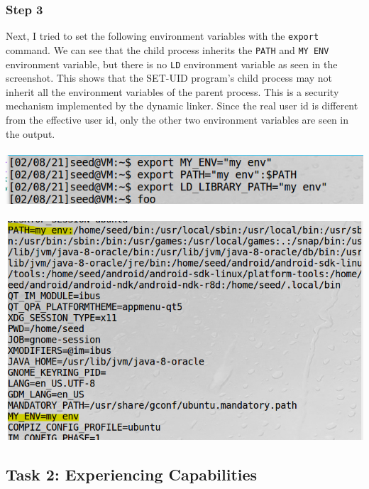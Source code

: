 \documentclass[a4paper]{article}
\begin{document}
\subsubsection{Step 3}
Next, I tried to set the following environment variables with the \verb+export+ command. We can see that the child process inherits the \verb+PATH+ and \verb+MY ENV+ environment variable, but there is no \verb+LD+ environment variable as seen in the screenshot. This shows that the SET-UID program's child process may not inherit all the environment variables of the parent process. This is a security mechanism implemented by the dynamic linker. Since the real user id is different from the effective user id, only the other two environment variables are seen in the output.\\\\
\includegraphics[scale=0.7]{1/2.png}\\\\
\includegraphics[scale=0.7]{1/3.png}\\
\pagebreak
\subsection{Task 2: Experiencing Capabilities}
\end{document}
